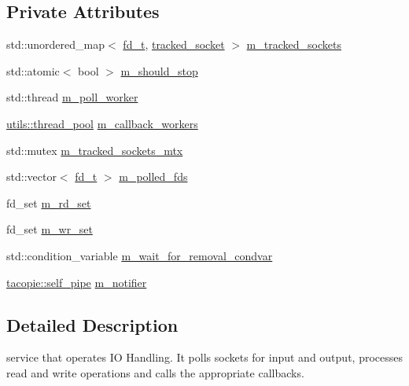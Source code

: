 \subsection*{Private Attributes}
\begin{DoxyCompactItemize}
\item 
std\+::unordered\+\_\+map$<$ \hyperlink{namespacetacopie_acce7ad26b2d30156b1e6fa353f727026}{fd\+\_\+t}, \hyperlink{structtacopie_1_1io__service_1_1tracked__socket}{tracked\+\_\+socket} $>$ \hyperlink{classtacopie_1_1io__service_a49c9b0b992a1fe203975029f8557ad1a}{m\+\_\+tracked\+\_\+sockets}
\item 
std\+::atomic$<$ bool $>$ \hyperlink{classtacopie_1_1io__service_a8d73334fcd84e31ccaada49f326d3463}{m\+\_\+should\+\_\+stop}
\item 
std\+::thread \hyperlink{classtacopie_1_1io__service_a882b2211bae06c87cdf6e9c04d2cb783}{m\+\_\+poll\+\_\+worker}
\item 
\hyperlink{classtacopie_1_1utils_1_1thread__pool}{utils\+::thread\+\_\+pool} \hyperlink{classtacopie_1_1io__service_ace8ecb6c752a0adb3b2fec1c92cf1161}{m\+\_\+callback\+\_\+workers}
\item 
std\+::mutex \hyperlink{classtacopie_1_1io__service_af73671e872d70c6e7d1c856185b5ddd6}{m\+\_\+tracked\+\_\+sockets\+\_\+mtx}
\item 
std\+::vector$<$ \hyperlink{namespacetacopie_acce7ad26b2d30156b1e6fa353f727026}{fd\+\_\+t} $>$ \hyperlink{classtacopie_1_1io__service_a5a505f908c39c88e19f092c603f29261}{m\+\_\+polled\+\_\+fds}
\item 
fd\+\_\+set \hyperlink{classtacopie_1_1io__service_a1d4388ceffa22976892ac5de95936f58}{m\+\_\+rd\+\_\+set}
\item 
fd\+\_\+set \hyperlink{classtacopie_1_1io__service_afca4de707285a1a373751e7e10b413ff}{m\+\_\+wr\+\_\+set}
\item 
std\+::condition\+\_\+variable \hyperlink{classtacopie_1_1io__service_ab48cce92a369604bf3409ebbbd6d345d}{m\+\_\+wait\+\_\+for\+\_\+removal\+\_\+condvar}
\item 
\hyperlink{classtacopie_1_1self__pipe}{tacopie\+::self\+\_\+pipe} \hyperlink{classtacopie_1_1io__service_ae8a17523ba4719b0e799d1c5d665e69f}{m\+\_\+notifier}
\end{DoxyCompactItemize}


\subsection{Detailed Description}
service that operates IO Handling. It polls sockets for input and output, processes read and write operations and calls the appropriate callbacks. 

